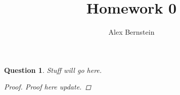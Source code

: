 \documentclass[10pt,letterpaper]{article}
\author{Alex Bernstein}
\title{Homework 0}
\newtheorem{problems}{Question}
\begin{document}
\begin{problems}
Stuff will go here.
\begin{proof}
Proof here update.
\end{proof}
\end{problems}
\end{document}

